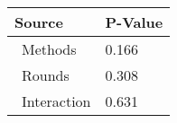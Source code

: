 
\centering
\begin{tabular}{ll}
\toprule
          Source & P-Value \\
\midrule
    \    Methods &   0.166 \\
     \    Rounds &   0.308 \\
\    Interaction &   0.631 \\
\bottomrule
\end{tabular}
